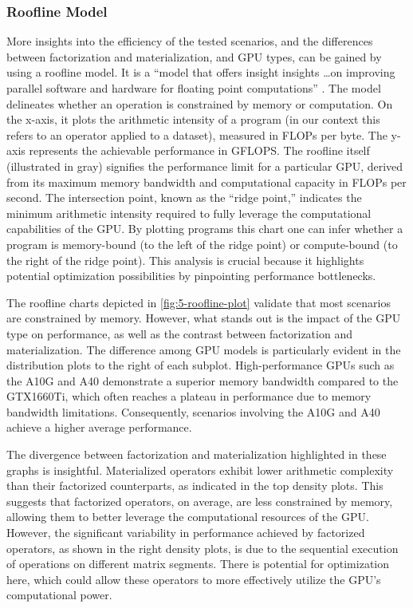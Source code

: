 \subsubsection*{Roofline Model}
More insights into the efficiency of the tested scenarios, and the differences between factorization and materialization, and GPU types, can be gained by using a roofline model. It is a “model that offers insight insights \ldots on improving parallel software and hardware for floating point computations” \cite{roofline}. The model delineates whether an operation is constrained by memory or computation. On the x-axis, it plots the arithmetic intensity of a program (in our context this refers to an operator applied to a dataset), measured in FLOPs per byte. The y-axis represents the achievable performance in GFLOPS. The roofline itself (illustrated in gray) signifies the performance limit for a particular GPU, derived from its maximum memory bandwidth and computational capacity in FLOPs per second. The intersection point, known as the ``ridge point,'' indicates the minimum arithmetic intensity required to fully leverage the computational capabilities of the GPU. By plotting programs this chart one can infer whether a program is memory-bound (to the left of the ridge point) or compute-bound (to the right of the ridge point). This analysis is crucial because it highlights potential optimization possibilities by pinpointing performance bottlenecks.

The roofline charts depicted in \autoref{fig:5-roofline-plot} validate that most scenarios are constrained by memory. However, what stands out is the impact of the GPU type on performance, as well as the contrast between factorization and materialization. The difference among GPU models is particularly evident in the distribution plots to the right of each subplot. High-performance GPUs such as the A10G and A40 demonstrate a superior memory bandwidth compared to the GTX1660Ti, which often reaches a plateau in performance due to memory bandwidth limitations. Consequently, scenarios involving the A10G and A40 achieve a higher average performance.

The divergence between factorization and materialization highlighted in these graphs is insightful. Materialized operators exhibit lower arithmetic complexity than their factorized counterparts, as indicated in the top density plots. This suggests that factorized operators, on average, are less constrained by memory, allowing them to better leverage the computational resources of the GPU. However, the significant variability in performance achieved by factorized operators, as shown in the right density plots, is due to the sequential execution of operations on different matrix segments. There is potential for optimization here, which could allow these operators to more effectively utilize the GPU’s computational power.

